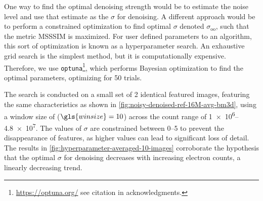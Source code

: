 One way to find the optimal denoising strength would be to estimate the noise level and use that estimate as the $\sigma$ for denoising. A different approach would be to perform a constrained optimization to find optimal $\sigma$ denoted $\sigma_{\text{oo}}$, such that the metric \gls{MSSSIM} is maximized. For user defined parameters to an algorithm, this sort of optimization is known as a hyperparameter search. An exhaustive grid search is the simplest method, but it is computationally expensive. Therefore, we use \texttt{optuna}\footnote{\href{https://optuna.org/}{https://optuna.org/} see citation in acknowledgments.}, which performs Bayesian optimization to find the optimal parameters, optimizing for \num{50} trials.

The search is conducted on a small set of \num{2} identical featured images, featuring the same characteristics as shown in \cref{fig:noisy-denoised-ref-16M-avg-bm3d}, using a window size of ($\gls{winsize} = \num{10}$) across the count range of \numrange{1e6}{4.8e7}. The values of $\sigma$ are constrained between \numrange{0}{5} to prevent the disappearance of features, as higher values can lead to significant loss of detail. The results in \cref{fig:hyperparameter-averaged-10-images} corroborate the hypothesis that the optimal $\sigma$ for denoising decreases with increasing electron counts, a linearly decreasing trend.

